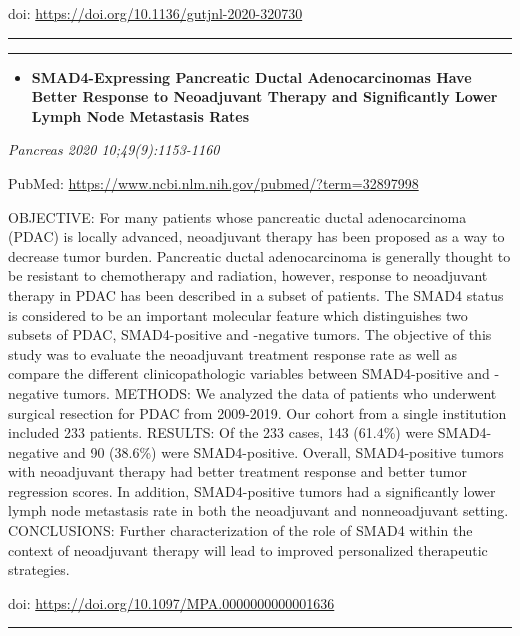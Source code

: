 \documentclass[
]{article}
\providecommand{\tightlist}{%
  \setlength{\itemsep}{0pt}\setlength{\parskip}{0pt}}
\begin{document}
doi: \url{https://doi.org/10.1136/gutjnl-2020-320730}

\begin{center}\rule{0.5\linewidth}{0.5pt}\end{center}

\begin{center}\rule{0.5\linewidth}{0.5pt}\end{center}

\begin{itemize}
\tightlist
\item
  \textbf{SMAD4-Expressing Pancreatic Ductal Adenocarcinomas Have Better
  Response to Neoadjuvant Therapy and Significantly Lower Lymph Node
  Metastasis Rates}
\end{itemize}

\emph{Pancreas 2020 10;49(9):1153-1160}

PubMed: \url{https://www.ncbi.nlm.nih.gov/pubmed/?term=32897998}

OBJECTIVE: For many patients whose pancreatic ductal adenocarcinoma
(PDAC) is locally advanced, neoadjuvant therapy has been proposed as a
way to decrease tumor burden. Pancreatic ductal adenocarcinoma is
generally thought to be resistant to chemotherapy and radiation,
however, response to neoadjuvant therapy in PDAC has been described in a
subset of patients. The SMAD4 status is considered to be an important
molecular feature which distinguishes two subsets of PDAC,
SMAD4-positive and -negative tumors. The objective of this study was to
evaluate the neoadjuvant treatment response rate as well as compare the
different clinicopathologic variables between SMAD4-positive and
-negative tumors. METHODS: We analyzed the data of patients who
underwent surgical resection for PDAC from 2009-2019. Our cohort from a
single institution included 233 patients. RESULTS: Of the 233 cases, 143
(61.4\%) were SMAD4-negative and 90 (38.6\%) were SMAD4-positive.
Overall, SMAD4-positive tumors with neoadjuvant therapy had better
treatment response and better tumor regression scores. In addition,
SMAD4-positive tumors had a significantly lower lymph node metastasis
rate in both the neoadjuvant and nonneoadjuvant setting. CONCLUSIONS:
Further characterization of the role of SMAD4 within the context of
neoadjuvant therapy will lead to improved personalized therapeutic
strategies.

doi: \url{https://doi.org/10.1097/MPA.0000000000001636}

\begin{center}\rule{0.5\linewidth}{0.5pt}\end{center}
\end{document}
